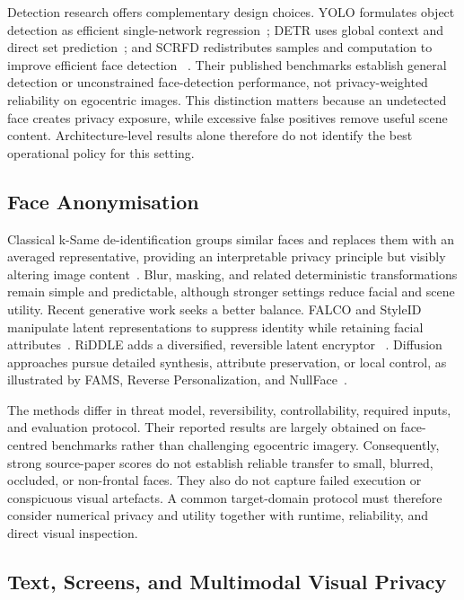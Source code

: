\documentclass[10pt,twocolumn]{IEEEtran}
\begin{document}
Detection research offers complementary design choices. YOLO formulates object
detection as efficient single-network regression~\cite{redmon2016yolo}; DETR
uses global context and direct set prediction~\cite{carion2020detr}; and SCRFD
redistributes samples and computation to improve efficient face detection
~\cite{guo2022scrfd}. Their published benchmarks establish general detection
or unconstrained face-detection performance, not privacy-weighted reliability on
egocentric images. This distinction matters because an undetected face creates
privacy exposure, while excessive false positives remove useful scene content.
Architecture-level results alone therefore do not identify the best operational
policy for this setting.

\subsection{Face Anonymisation}

Classical k-Same de-identification groups similar faces and replaces them with
an averaged representative, providing an interpretable privacy principle but
visibly altering image content~\cite{newton2005deidentifying}. Blur, masking, and related
deterministic transformations remain simple and predictable, although stronger
settings reduce facial and scene utility. Recent generative work seeks a better
balance. FALCO and StyleID manipulate latent representations to suppress identity
while retaining facial attributes~\cite{barattin2023falco,le2023styleid}.
RiDDLE adds a diversified, reversible latent encryptor
~\cite{li2023riddle}. Diffusion approaches pursue detailed synthesis, attribute
preservation, or local control, as illustrated by FAMS, Reverse Personalization,
and NullFace~\cite{kung2025fams,kung2026reverse,kung2026nullface}.

The methods differ in threat model, reversibility, controllability, required
inputs, and evaluation protocol. Their reported results are largely obtained on
face-centred benchmarks rather than challenging egocentric imagery.
Consequently, strong source-paper scores do not establish reliable transfer to
small, blurred, occluded, or non-frontal faces. They also do not capture failed
execution or conspicuous visual artefacts. A common target-domain protocol must
therefore consider numerical privacy and utility together with runtime,
reliability, and direct visual inspection.

\subsection{Text, Screens, and Multimodal Visual Privacy}
\end{document}
